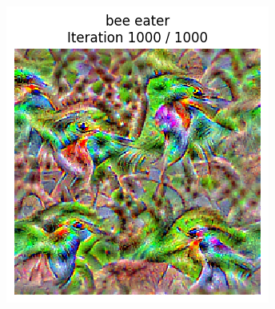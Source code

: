 \begin{figure}[H]
\begin{subfigure}[t]{.25\textwidth}
        \caption{}
        \label{fig:class_viz_iter:sub2}
    \end{subfigure}%
    \begin{subfigure}[t]{.25\textwidth}
        \centering
        \includegraphics[width=\linewidth]{SqueezeNet/bird_animated_1000_regpp_blur_last_frame.png}
        \caption{}
        \label{fig:class_viz_iter:sub3}
    \end{subfigure}%
    \begin{subfigure}[t]{.25\textwidth}
        \centering

\end{subfigure}
\end{figure}
